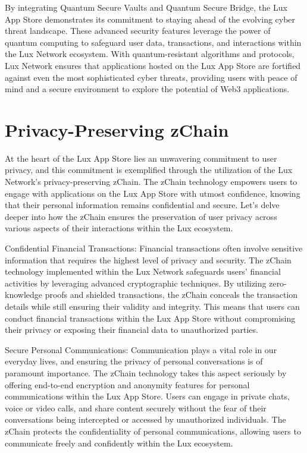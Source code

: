 \documentclass[11pt]{article}
\begin{document}
By integrating Quantum Secure Vaults and Quantum Secure Bridge, the Lux App Store demonstrates its commitment to staying ahead of the evolving cyber threat landscape. These advanced security features leverage the power of quantum computing to safeguard user data, transactions, and interactions within the Lux Network ecosystem. With quantum-resistant algorithms and protocols, Lux Network ensures that applications hosted on the Lux App Store are fortified against even the most sophisticated cyber threats, providing users with peace of mind and a secure environment to explore the potential of Web3 applications.


\section{Privacy-Preserving zChain}

At the heart of the Lux App Store lies an unwavering commitment to user privacy, and this commitment is exemplified through the utilization of the Lux Network's privacy-preserving zChain. The zChain technology empowers users to engage with applications on the Lux App Store with utmost confidence, knowing that their personal information remains confidential and secure. Let's delve deeper into how the zChain ensures the preservation of user privacy across various aspects of their interactions within the Lux ecosystem.


Confidential Financial Transactions: Financial transactions often involve sensitive information that requires the highest level of privacy and security. The zChain technology implemented within the Lux Network safeguards users' financial activities by leveraging advanced cryptographic techniques. By utilizing zero-knowledge proofs and shielded transactions, the zChain conceals the transaction details while still ensuring their validity and integrity. This means that users can conduct financial transactions within the Lux App Store without compromising their privacy or exposing their financial data to unauthorized parties.


Secure Personal Communications: Communication plays a vital role in our everyday lives, and ensuring the privacy of personal conversations is of paramount importance. The zChain technology takes this aspect seriously by offering end-to-end encryption and anonymity features for personal communications within the Lux App Store. Users can engage in private chats, voice or video calls, and share content securely without the fear of their conversations being intercepted or accessed by unauthorized individuals. The zChain protects the confidentiality of personal communications, allowing users to communicate freely and confidently within the Lux ecosystem.
\end{document}
